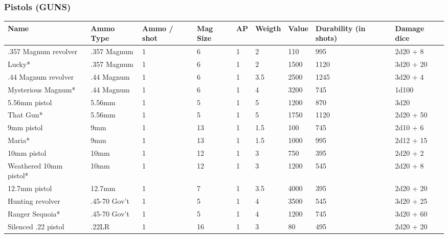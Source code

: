 
\subsubsection{Pistols (GUNS)}
\begin{longtable}{|p{3.2cm}|p{2.4cm}|p{1.3cm}|p{.9cm}|p{0.6cm}|p{1.3cm}|p{1cm}|p{2cm}|p{3.2cm}|}
\hline
\bfseries Name & \bfseries Ammo Type & \bfseries Ammo / shot & \bfseries Mag Size & \bfseries AP & \bfseries Weigth & \bfseries Value & \bfseries Durability (in shots) & \bfseries Damage dice \\
\hline
\endhead
.357 Magnum revolver & .357 Magnum & 1 & 6 & 1 & 2 & 110 & 995 & 2d20 + 8 \\
Lucky* & .357 Magnum & 1 & 6 & 1 & 2 & 1500 & 1120 & 3d20 + 20 \\
.44 Magnum revolver & .44 Magnum & 1 & 6 & 1 & 3.5 & 2500 & 1245 & 3d20 + 4 \\
Mysterious Magnum* & .44 Magnum & 1 & 6 & 1 & 4 & 3200 & 745 & 1d100 \\
5.56mm pistol & 5.56mm & 1 & 5 & 1 & 5 & 1200 & 870 & 3d20 \\
That Gun* & 5.56mm & 1 & 5 & 1 & 5 & 1750 & 1120 & 2d20 + 50 \\
9mm pistol & 9mm & 1 & 13 & 1 & 1.5 & 100 & 745 & 2d10 + 6 \\
Maria* & 9mm & 1 & 13 & 1 & 1.5 & 1000 & 995 & 2d12 + 15 \\
10mm pistol & 10mm & 1 & 12 & 1 & 3 & 750 & 395 & 2d20 + 2 \\
Weathered 10mm pistol* & 10mm & 1 & 12 & 1 & 3 & 1200 & 545 & 2d20 + 8 \\
12.7mm pistol & 12.7mm & 1 & 7 & 1 & 3.5 & 4000 & 395 & 2d20 + 20 \\
Hunting revolver & .45-70 Gov't & 1 & 5 & 1 & 4 & 3500 & 545 & 3d20 + 25 \\
Ranger Sequoia* & .45-70 Gov't & 1 & 5 & 1 & 4 & 1200 & 745 & 3d20 + 60 \\
Silenced .22 pistol & .22LR & 1 & 16 & 1 & 3 & 80 & 495 & 2d20 + 20 \\
\hline
\end{longtable}
